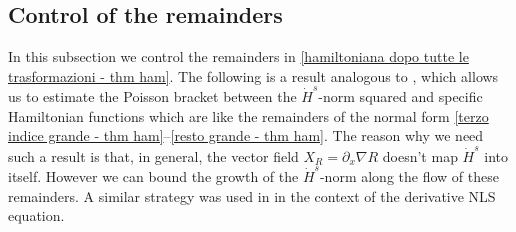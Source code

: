 \documentclass[a4paper,10pt,reqno]{article}
\theoremstyle{definition}
\theoremstyle{plain}
\theoremstyle{plain}
\theoremstyle{definition}
\theoremstyle{plain}
\theoremstyle{plain}
\theoremstyle{plain}
\theoremstyle{definition}
\theoremstyle{definition}
\begin{document}
\subsection{Control of the remainders}

In this subsection we control the remainders in \eqref{hamiltoniana dopo tutte le trasformazioni - thm ham}.
The following is a result analogous to \cite[Proposition 3.3]{bernier}, which allows us to estimate the Poisson bracket between the $\dot{H}^s$-norm squared and specific Hamiltonian functions which are like the remainders of the normal form \eqref{terzo indice grande - thm ham}--\eqref{resto grande - thm ham}.
The reason why we need such a result is that, in general, the vector field $X_R = \partial_x \nabla R$ doesn't map $\dot{H}^s$ into itself.
However we can bound the growth of the $\dot{H}^s$-norm along the flow of these remainders. A similar strategy was used in \cite{yuanzhang} in the context of the derivative NLS equation.

\,
\end{document}
